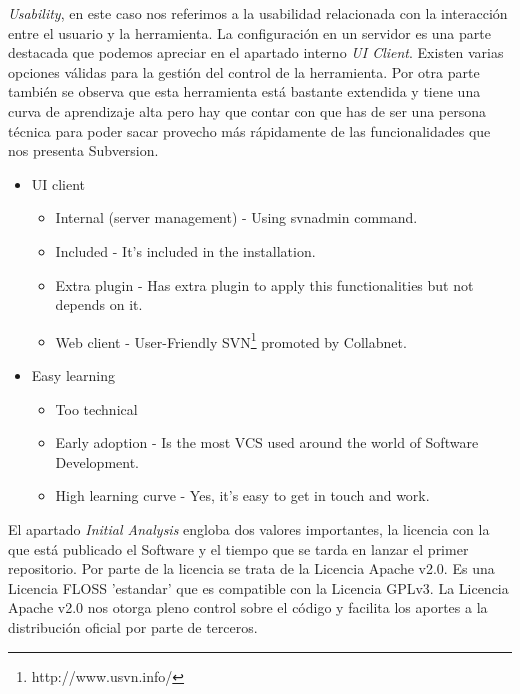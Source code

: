 \documentclass[11pt]{scrartcl}
\begin{document}
\par \emph{Usability}, en este caso nos referimos a la usabilidad relacionada con la interacci\'on entre el usuario y la herramienta. La configuraci\'on en un servidor es una parte destacada que podemos apreciar en el apartado interno \emph{UI Client}. Existen varias opciones v\'alidas para la gesti\'on del control de la herramienta. Por otra parte tambi\'en se observa que esta herramienta est\'a bastante extendida y tiene una curva de aprendizaje alta pero hay que contar con que has de ser una persona t\'ecnica para poder sacar provecho m\'as r\'apidamente de las funcionalidades que nos presenta Subversion.

\begin{itemize}
    \item UI client
	    \begin{itemize}
            \item Internal (server management) - Using svnadmin command.
            \item Included - It's included in the installation.
            \item Extra plugin - Has extra plugin to apply this functionalities but not depends on it.
            \item Web client - User-Friendly SVN\footnote{http://www.usvn.info/} promoted by Collabnet.
        \end{itemize}

    \item Easy learning
	    \begin{itemize}
            \item Too technical 
            \item Early adoption - Is the most VCS used around the world of Software Development.
            \item High learning curve - Yes, it's easy to get in touch and work.
        \end{itemize}
\end{itemize}

\par El apartado \emph{Initial Analysis} engloba dos valores importantes, la licencia con la que est\'a publicado el Software y el tiempo que se tarda en lanzar el primer repositorio. Por parte de la licencia se trata de la Licencia Apache v2.0. Es una Licencia FLOSS 'estandar' que es compatible con la Licencia GPLv3. La Licencia Apache v2.0 nos otorga pleno control sobre el c\'odigo y facilita los aportes a la distribuci\'on oficial por parte de terceros.
\end{document}
